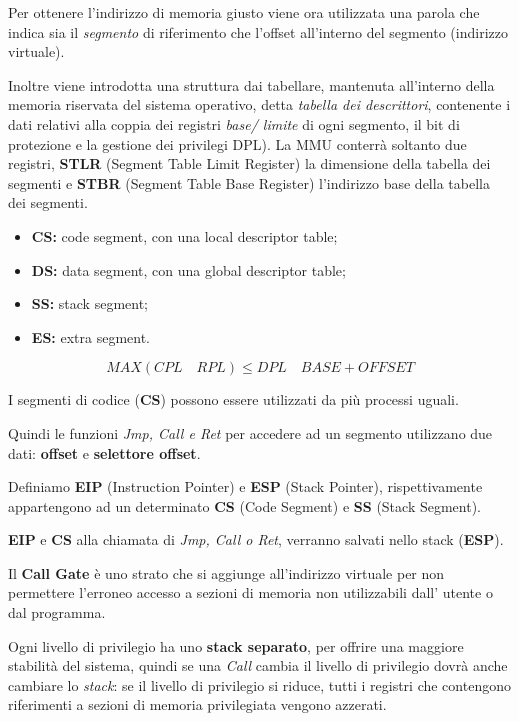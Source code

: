 Per ottenere l'indirizzo di memoria giusto viene ora utilizzata una parola che
indica sia il \emph{segmento} di riferimento che l'offset all'interno del
segmento (indirizzo virtuale).


Inoltre viene introdotta una struttura dai tabellare, mantenuta all'interno
della memoria riservata del sistema operativo, detta \textit{tabella dei
descrittori}, contenente i dati relativi alla coppia dei registri \textit{base/
limite} di ogni segmento, il bit di protezione e la gestione dei privilegi
DPL).
La MMU conterrà soltanto due registri, \textbf{STLR} (Segment Table Limit
Register) la dimensione della tabella dei segmenti e \textbf{STBR} (Segment
Table Base Register) l'indirizzo base della tabella dei segmenti.

\begin{itemize}
  \item \textbf{CS:} code segment, con una local descriptor table;
  \item \textbf{DS:} data segment, con una global descriptor table;
  \item \textbf{SS:} stack segment;
  \item \textbf{ES:} extra segment.
\end{itemize}
\[
  MAX(CPL \quad RPL) \leq DPL \quad BASE + OFFSET
\]

I segmenti di codice (\textbf{CS}) possono essere utilizzati da più processi
uguali.

Quindi le funzioni \textit{Jmp, Call e Ret} per accedere ad un segmento
utilizzano due dati: \textbf{offset} e \textbf{selettore offset}.

Definiamo \textbf{EIP} (Instruction Pointer) e \textbf{ESP} (Stack Pointer),
rispettivamente appartengono ad un determinato \textbf{CS} (Code Segment) e
\textbf{SS} (Stack Segment).

\textbf{EIP} e \textbf{CS} alla chiamata di \textit{Jmp, Call o Ret}, verranno
salvati nello stack (\textbf{ESP}).



Il \textbf{Call Gate} è uno strato che si aggiunge all'indirizzo virtuale per
non permettere l'erroneo accesso a sezioni di memoria non utilizzabili dall'
utente o dal programma.


Ogni livello di privilegio ha uno \textbf{stack separato}, per offrire una
maggiore stabilità del sistema, quindi se una \emph{Call} cambia il livello
di privilegio dovrà anche cambiare lo \emph{stack}: se il livello di privilegio
si riduce, tutti i registri che contengono riferimenti a sezioni di memoria
privilegiata vengono azzerati.

